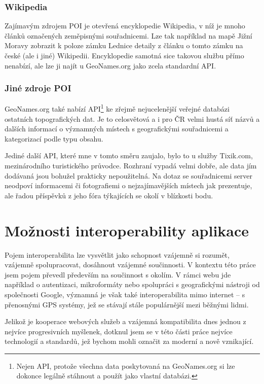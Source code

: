 \subsection{Wikipedia}
Zajímavým zdrojem POI je otevřená encyklopedie Wikipedia, v níž je
mnoho článků označených zeměpisnými souřadnicemi. Lze tak například
na mapě Jižní Moravy zobrazit k poloze zámku Lednice detaily z článku
o tomto zámku na české (ale i jiné) Wikipedii. Encyklopedie samotná
sice takovou službu přímo nenabízí, ale lze ji najít u GeoNames.org
jako zcela standardní API.

\subsection{Jiné zdroje POI}
GeoNames.org také nabízí API\footnote{Nejen API, protože všechna data
poskytovaná na GeoNames.org si lze dokonce legálně stáhnout a použít
jako vlastní databázi.} ke zřejmě nejucelenější veřejné databázi
ostatních topografických dat. Je to celosvětová a i pro ČR velmi
hustá síť názvů a dalších informací o významných místech s
geografickými souřadnicemi a kategorizací podle typu obsahu.

Jediné další API, které mne v tomto směru zaujalo, bylo to u služby
Tixik.com, mezinárodního turistického průvodce. Rozhraní vypadá velmi
dobře, ale data jím dodávaná jsou bohužel prakticky nepoužitelná. Na
dotaz se souřadnicemi server neodpoví
informacemi či fotografiemi o nejzajímavějších místech jak
prezentuje, ale řadou příspěvků z jeho fóra týkajících se okolí v
blízkosti bodu.

\chapter{Možnosti interoperability aplikace}
Pojem interoperabilita lze vysvětlit jako schopnost vzájemně si
rozumět, vzájemně spolupracovat, dosáhnout vzájemné součinnosti. V
kontextu této práce jsem pojem převedl především na součinnost s
okolím. V rámci webu jde například o autentizaci, mikroformáty nebo
spolupráci s geografickými nástroji od společnosti Google, významná je
však také interoperabilita mimo internet -- s přenosnými GPS systémy,
jež se stávají stále populárnější mezi běžnými lidmi.

Jelikož je kooperace webových služeb a vzájemná kompatibilita dnes
jednou z nejvíce progresivních myšlenek, dotknul jsem se v této části
práce nejvíce technologií a standardů, jež bychom mohli označit za
moderní a nově vznikající.

